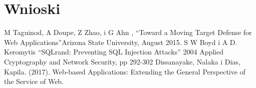 \documentclass[conference]{IEEEtran}
\begin{document}
\section{Wnioski}

\begin{thebibliography}{00}
     M Taguinod, A Doupe, Z Zhao, i G Ahn , ``Toward a Moving Target Defense for Web Applications''Arizona State University, August 2015.
     S W Boyd i A D. Keromytis ``SQLrand: Preventing SQL Injection Attacks'' 2004 Applied Cryptography and Network Security, pp 292-302
     Dissanayake, Nalaka i Dias, Kapila. (2017). Web-based Applications: Extending the General Perspective of the Service of Web.
\end{thebibliography}
\vspace{12pt}
\end{document}
